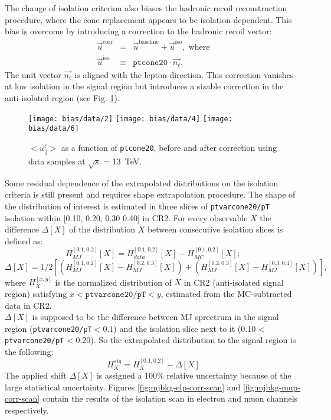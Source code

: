  The change of isolation criterion also biases the hadronic recoil reconstruction procedure, where the cone replacement appears to be isolation-dependent. This bias is overcome by introducing a correction to the hadronic recoil vector:
 \begin{eqnarray}
 \vec{u}^\text{corr} &=& \vec{u}^\text{baseline} + \vec{u}^\text{iso}, \text{ where}\\
 \vec{u}^\text{iso} &\equiv& \texttt{ptcone20} \cdot \vec{n_\ell}.
 \end{eqnarray}
 The unit vector $\vec{n_\ell}$ is aligned with the lepton direction. This correction vanishes at low isolation in the signal region but introduces a sizable correction in the anti-isolated region (see Fig. \ref{fig:calib_upar}).
 \begin{figure}
 	\centering
 	\texttt{[image: bias/data/2]}
 	\texttt{[image: bias/data/4]}
 	\texttt{[image: bias/data/6]}
 	\caption{$<u_\parallel^\ell>$ as a function of \texttt{ptcone20}, before and after correction using data samples at $\sqrt{s}$ = 13~TeV.}
 	\label{fig:calib_upar}
 \end{figure}
Some residual dependence of the extrapolated distributions on the isolation criteria is still present and requires shape extrapolation procedure. The shape of the distribution of interest is estimated in three slices of \texttt{ptvarcone20/pT} isolation within [0.10, 0.20, 0.30 0.40] in CR2. For every observable $X$ the difference $\Delta[X]$ of the distribution $X$ between consecutive isolation slices is defined as:
\begin{equation}
H_{MJ}^{[0.1,0.2]}[X] = H_{data}^{[0.1,0.2]}[X] - H_{MC}^{[0.1,0.2]}[X]; 
\end{equation}
\begin{equation}
\Delta[X]= 1/2 \left[ (H_{MJ}^{[0.1,0.2]}[X]-H_{MJ}^{[0.2,0.3]}[X]) + (H_{MJ}^{[0.2,0.3]}[X]-H_{MJ}^{[0.3,0.4]}[X]) \right],
\end{equation}
where $H_{X}^{[x,y]}$ is the normalized distribution of $X$ in CR2 (anti-isolated signal region) satisfying $x < \texttt{ptvarcone20/pT} < y$, estimated from the MC-subtracted data in CR2.\\
$\Delta[X]$ is supposed to be the difference between MJ sprectrum in the signal region (\texttt{ptvarcone20/pT}$<0.1$)  and the isolation slice next to it (0.10 < \texttt{ptvarcone20/pT} < 0.20).
So the extrapolated distribution to the signal region is the following:
\begin{equation}
H_{X}^{sig} = H_{X}^{[0.1,0.2]} - \Delta[X]
\end{equation}
The applied shift $\Delta[X]$ is assigned a 100\% relative uncertainty because of the large statistical uncertainty. Figures \ref{fig:mjbkg-elp-corr-scan} and \ref{fig:mjbkg-mup-corr-scan} contain the results of the isolation scan in electron and muon channels respectively. 


